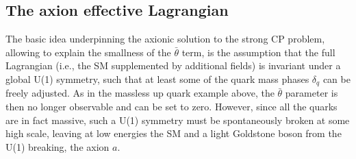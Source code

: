 \subsection{The axion effective Lagrangian}\label{AxionInteractions}
The basic idea underpinning the axionic solution to the strong CP problem,  
allowing to explain the smallness of the $\bar\theta$ term,
 is the assumption that the full Lagrangian (i.e., the SM supplemented by additional fields) is invariant under a global  U(1) symmetry, such that at least some of the quark mass phases $\delta_q$ can be freely adjusted. As in the massless up quark example above, the $\bar\theta$ parameter  is then no longer observable and can be set to zero. 
However, since all the quarks are in fact massive, such a U(1) symmetry must be
spontaneously broken at some high scale,
leaving at low energies the SM and a light Goldstone boson from the U(1) breaking, the axion $a$.

\smallskip


